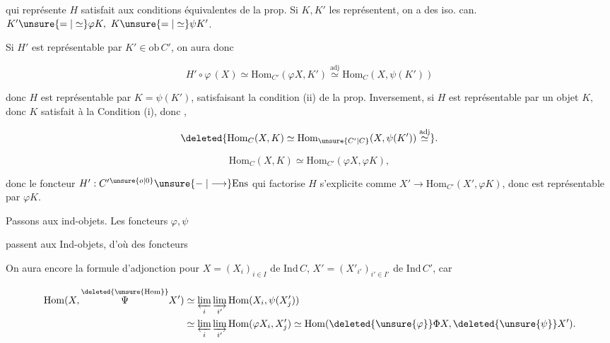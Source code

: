
qui représente $H$ satisfait aux conditions équivalentes de la prop. Si $K,K'$ les représentent, on a des iso. can. $K'\unsure{=|\simeq}\varphi K,\ K\unsure{=|\simeq}\psi K'$.

Si $H'$ est représentable par $K'\in\mathrm{ob}\,C'$, on aura donc

\[
 H'\circ\varphi\,(X)\simeq\mathrm{Hom}_{C'}(\varphi X,K')\overset{\mathrm{adj}}{\simeq}
 \mathrm{Hom}_C(X,\psi(K'))
\]

donc $H$ est représentable par $K=\psi(K')$, satisfaisant la condition (ii) de la prop. Inversement, si  $H$ est représentable par un objet $K$, donc $K$ satisfait à la Condition (i), donc ,  

\[
 \deleted{\mathrm{Hom}_C(X,K)\simeq\mathrm{Hom}_{\unsure{C'|C}}(X,\psi(K'))\overset{\mathrm{adj}}{\simeq}}.
\]

\[
 \mathrm{Hom}_C(X,K)\simeq\mathrm{Hom}_{C'}(\varphi X,\varphi K),
\]

donc le foncteur $H':C'{}^{\unsure{o|0}}\unsure{\relbar|\longrightarrow}\mathrm{Ens}$ qui factorise $H$ s'explicite comme $X'\to\mathrm{Hom}_{C'}(X',\varphi K)$,  donc est représentable par $\varphi K$.

Passons  aux ind-objets.  Les foncteurs $\varphi,\psi$


passent aux Ind-objets, d'où des foncteurs


On aura encore la formule d'adjonction pour $X=(X_i)_{i\in I}$ de $\mathrm{Ind}\,C$, $X'=(X'_{i'})_{i'\in I'}$ de $\mathrm{Ind}\,C'$, car

\[
\begin{aligned}
 \mathrm{Hom}(X,\overset{\deleted{\unsure{\mathrm{Hom}}}}{\Psi}X')&
 \simeq\varprojlim_i\varinjlim_{i'}\mathrm{Hom}(X_i,\psi(X'_j))\\
 &\simeq\varprojlim_i\varinjlim_{i'}\mathrm{Hom}(\varphi X_i,X'_j)
 \simeq\mathrm{Hom}(\deleted{\unsure{\varphi}}\Phi X,\deleted{\unsure{\psi}}X').
\end{aligned}
\]

